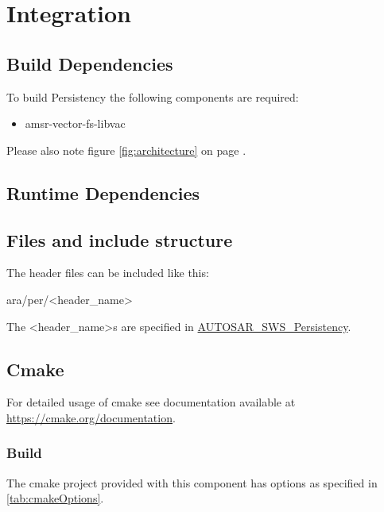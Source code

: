 \chapter{Integration}
\label{chap:Integration}

\section{Build Dependencies}
\label{sec:BuildDependencies}

To build Persistency the following components are required:
\begin{itemize}
	\item amsr-vector-fs-libvac
\end{itemize}
Please also note figure \ref{fig:architecture} on page
\pageref{fig:architecture}.

\section{Runtime Dependencies}
\label{sec:RuntimeDependencies}

\section{Files and include structure}
\label{sec:FilesAndIncludeStructure}

The header files can be included like this:

ara/per/<header\_name>

The <header\_name>s are specified in
\href{https://www.autosar.org/fileadmin/user\_upload/standards/adaptive/17-10/AUTOSAR\_SWS_Persistency.pdf}{AUTOSAR\_SWS\_Persistency}.

\section{Cmake}
\label{sec:Cmake}
For detailed usage of cmake see documentation available at
\href{cmake.org}{https://cmake.org/documentation}.

\subsection{Build}
\label{sec:Cmake:Build}
The cmake project provided with this component has options as specified in
\ref{tab:cmakeOptions}.

